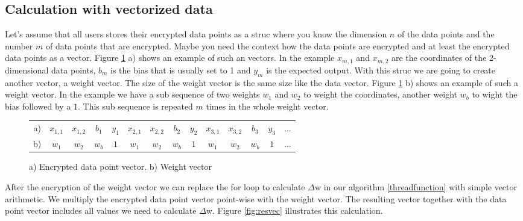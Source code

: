 \subsection{Calculation with vectorized data}
\begin{text}
Let's assume that all users stores their encrypted data points as a struc where you know the dimension $n$ of the data points and the number $m$ of data points that are encrypted. Maybe you need the context how the data points are encrypted and at least the encrypted data points as a vector. Figure \ref{fig:vec} a) shows an example of such an vectors. In the example $x_{m,1}$ and $x_{m,2}$ are the coordinates of the 2-dimensional data points, $b_m$ is the bias that is usually set to 1 and $y_m$ is the expected output. With this struc we are going to create another vector, a weight vector. The size of the weight vector is the same size like the data vector. Figure \ref{fig:vec} b) shows an example of such a weight vector. In the example we have a sub sequence of two weights $w_1$ and $w_2$ to weight the coordinates, another weight $w_b$ to wight the bias followed by a $1$. This sub sequence is repeated $m$ times in the whole weight vector. \newline

\begin{figure}[ht]
    \centering
    \begin{tabular}{c|c|c|c|c|c|c|c|c|c|c|c|c|c}
        \cline{2-13}
        a) & $x_{1,1}$ & $x_{1,2}$ & $b_{1}$ & $y_{1}$ & $x_{2,1}$ & $x_{2,2}$ & $b_{2}$ & $y_{2}$ & $x_{3,1}$ & $x_{3,2}$ & $b_{3}$ & $y_{3}$ & $\dots$  \\
        \cline{2-13}
        \noalign{\medskip}
        \cline{2-13}
        b) & $w_1$ & $w_2$ & $w_b$ & $1$ & $w_1$ & $w_2$ & $w_b$ & $1$ & $w_1$ & $w_2$ & $w_b$ & $1$ & $\dots$  \\
        \cline{2-13}
    \end{tabular}
    \caption{a) Encrypted data point vector. b) Weight vector}
    \label{fig:vec}
\end{figure}

After the encryption of the weight vector we can replace the for loop to calculate $\Delta$w in our algorithm \ref{threadfunction} with simple vector arithmetic. We multiply the encrypted data point vector point-wise with the weight vector. The resulting vector together with the data point vector includes all values we need to calculate $\Delta$w. Figure \ref{fig:resvec} illustrates this calculation. \newline


\end{text}
